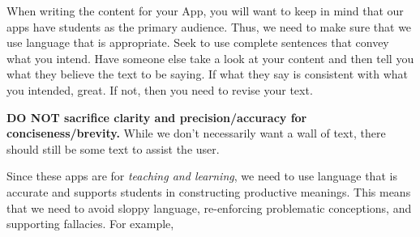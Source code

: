 \documentclass[
]{book}
\begin{document}
When writing the content for your App, you will want to keep in mind that our apps have students as the primary audience. Thus, we need to make sure that we use language that is appropriate. Seek to use complete sentences that convey what you intend. Have someone else take a look at your content and then tell you what they believe the text to be saying. If what they say is consistent with what you intended, great. If not, then you need to revise your text.

\textbf{DO NOT sacrifice clarity and precision/accuracy for
conciseness/brevity.} While we don't necessarily want a wall of text, there should still be some text to assist the user.

Since these apps are for \emph{teaching and learning}, we need to use language that is accurate and supports students in constructing productive meanings. This means that we need to avoid sloppy language, re-enforcing problematic conceptions, and supporting fallacies. For example,
\end{document}
